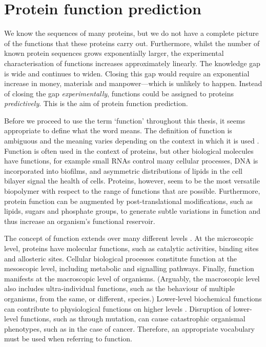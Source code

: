 \section{Protein function prediction}
\label{sec:intro-function}

We know the sequences of many proteins, but we do not have a complete picture of the functions that these proteins carry out. Furthermore, whilst the number of known protein sequences grows exponentially larger, the experimental characterisation of functions increases approximately linearly. The knowledge gap is wide and continues to widen. Closing this gap would require an exponential increase in money, materials and manpower---which is unlikely to happen. Instead of closing the gap \emph{experimentally}, functions could be assigned to proteins \emph{predictively}. This is the aim of protein function prediction.

Before we proceed to use the term `function' throughout this thesis, it seems appropriate to define what the word means. The definition of function is ambiguous and the meaning varies depending on the context in which it is used \cite{Bork1998,Friedberg2006}. Function is often used in the context of proteins, but other biological molecules have functions, for example small RNAs control many cellular processes, DNA is incorporated into biofilms, and asymmetric distributions of lipids in the cell bilayer signal the health of cells. Proteins, however, seem to be the most versatile biopolymer with respect to the range of functions that are possible. Furthermore, protein function can be augmented by post-translational modifications, such as lipids, sugars and phosphate groups, to generate subtle variations in function and thus increase an organism's functional reservoir.

The concept of function extends over many different levels \cite{Bork1998,Watson2005}. At the microscopic level, proteins have molecular functions, such as catalytic activities, binding sites and allosteric sites. Cellular biological processes constitute function at the mesoscopic level, including metabolic and signalling pathways. Finally, function manifests at the macroscopic level of organisms. (Arguably, the macroscopic level also includes ultra-individual functions, such as the behaviour of multiple organisms, from the same, or different, species.) Lower-level biochemical functions can contribute to physiological functions on higher levels \cite{Friedberg2006}. Disruption of lower-level functions, such as through mutation, can cause catastrophic organismal phenotypes, such as in the case of cancer. Therefore, an appropriate vocabulary must be used when referring to function.

